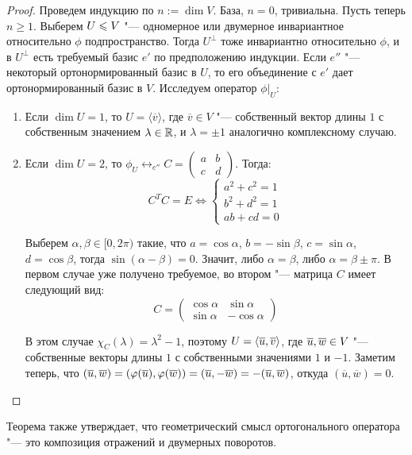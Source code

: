 \begin{proof}
	Проведем индукцию по $n := \dim{V}$. База, $n = 0$, тривиальна. Пусть теперь $n \ge 1$. Выберем $U \hm{\le} V$ "--- одномерное или двумерное инвариантное относительно $\phi$ подпространство. Тогда $U^\perp$ тоже инвариантно относительно $\phi$, и в $U^\perp$ есть требуемый базис $e'$ по предположению индукции. Если $e''$ "--- некоторый ортонормированный базис в $U$, то его объединение с $e'$ дает ортонормированный базис в $V$. Исследуем оператор $\phi|_U$:
	\begin{enumerate}
		\item Если $\dim{U} = 1$, то $U = \langle\overline{v}\rangle$, где $\overline{v} \in V$ "--- собственный вектор длины $1$ с собственным значением $\lambda \in \mathbb{R}$, и $\lambda = \pm1$ аналогично комплексному случаю.
		\item Если $\dim{U} = 2$, то $\phi_U \leftrightarrow_{e''} C = \begin{pmatrix}a&b\\c&d\end{pmatrix}$. Тогда:
		\[C^TC = E \Leftrightarrow \left\{\begin{aligned}
			a^2 + c^2 = 1\\
			b^2 + d^2 = 1\\
			ab + cd = 0
		\end{aligned}\right.\]
		
		Выберем $\alpha, \beta \in [0, 2\pi)$ такие, что  $a = \cos{\alpha}$, $b = -\sin{\beta}$, $c = \sin{\alpha}$, $d = \cos{\beta}$, тогда $\sin{(\alpha - \beta)} = 0$. Значит, либо $\alpha = \beta$, либо $\alpha = \beta \pm \pi$. В первом случае уже получено требуемое, во втором "--- матрица $C$ имеет следующий вид:
		\[C = \begin{pmatrix}\cos{\alpha}&\sin{\alpha}\\\sin{\alpha}&-\cos{\alpha}\end{pmatrix}\]
		
		В этом случае $\chi_C(\lambda) = \lambda^2 - 1$, поэтому $U = \langle\overline{u}, \overline{v}\rangle$, где $\overline{u}, \overline{w} \hm{\in} V$ "--- собственные векторы длины $1$ с собственными значениями $1$ и $-1$. Заметим теперь, что $(\overline{u}, \overline{w}) \hm{=} (\phi(\overline{u}), \phi(\overline{w})) \hm= (\overline{u}, -\overline{w}) = -(\overline{u}, \overline{w})$, откуда $(\overline{u}, \overline{w}) = 0$.\qedhere
	\end{enumerate}
\end{proof}

\begin{note}
	Теорема также утверждает, что геометрический смысл ортогонального оператора "--- это композиция отражений и двумерных поворотов.
\end{note}

